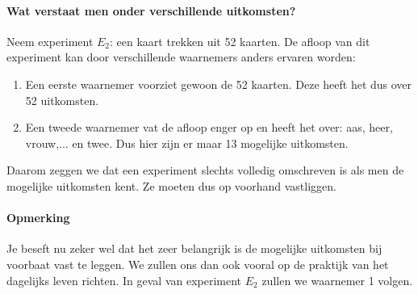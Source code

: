 \documentclass[12pt,twoside]{article}
\begin{document}
\paragraph*{Wat verstaat men onder verschillende uitkomsten?}

Neem experiment $E_2$: een kaart trekken uit 52 kaarten. De afloop van dit experiment
kan door verschillende waarnemers anders ervaren worden:
\begin{enumerate}
  \item Een eerste waarnemer voorziet gewoon de 52 kaarten. Deze heeft het dus over 52 uitkomsten.
  \item Een tweede waarnemer vat de afloop enger op en heeft het over: aas, heer, vrouw,... en twee. Dus hier zijn er maar 13 mogelijke uitkomsten.
\end{enumerate}

Daarom zeggen we dat een experiment slechts volledig omschreven is als men de mogelijke uitkomsten kent. Ze moeten dus op voorhand vastliggen.

\paragraph*{Opmerking}
Je beseft nu zeker wel dat het zeer belangrijk is de mogelijke uitkomsten bij
voorbaat vast te leggen. We zullen ons dan ook vooral op de praktijk van het dagelijks
leven richten. In geval van experiment $E_2$ zullen we waarnemer 1 volgen.
\end{document}
